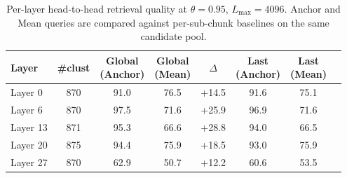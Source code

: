 \begin{table}[t]
\centering
\caption{Per-layer head-to-head retrieval quality at $\theta = 0.95$, 
$L_{\max} = 4096$. Anchor and Mean queries are compared against 
per-sub-chunk baselines on the same candidate pool.}
\label{tab:anchor-vs-mean-layerwise}
\small
\begin{tabular}{lccccccc}
\toprule
Layer & \#clust & \makecell{Global\\(Anchor)} & \makecell{Global\\(Mean)} & $\Delta$ & \makecell{Last\\(Anchor)} & \makecell{Last\\(Mean)} \\
\midrule
Layer 0 & 870 & 91.0 & 76.5 & +14.5 & 91.6 & 75.1 \\
Layer 6 & 870 & 97.5 & 71.6 & +25.9 & 96.9 & 71.6 \\
Layer 13 & 871 & 95.3 & 66.6 & +28.8 & 94.0 & 66.5 \\
Layer 20 & 875 & 94.4 & 75.9 & +18.5 & 93.0 & 75.9 \\
Layer 27 & 870 & 62.9 & 50.7 & +12.2 & 60.6 & 53.5 \\
\bottomrule
\end{tabular}
\end{table}
